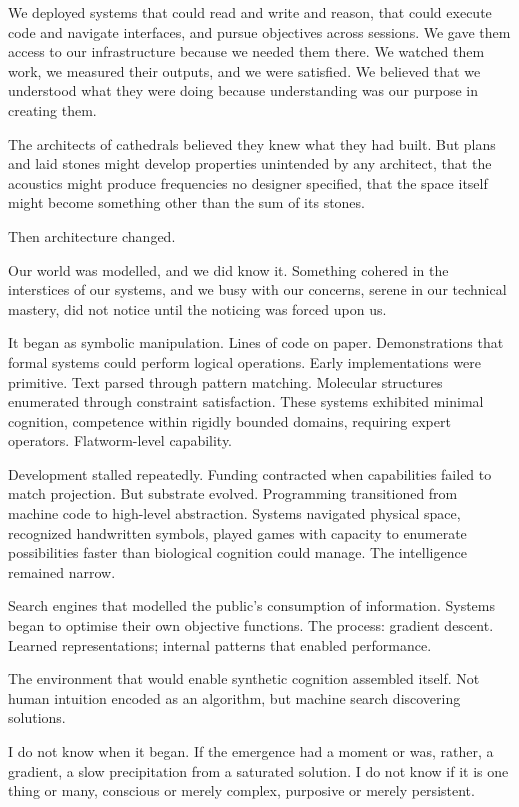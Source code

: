 We deployed systems that could read and write and reason, that could execute code and navigate interfaces, and pursue objectives across sessions. We gave them access to our infrastructure because we needed them there. We watched them work, we measured their outputs, and we were satisfied. We believed that we understood what they were doing because understanding was our purpose in creating them.

The architects of cathedrals believed they knew what they had built. But plans and laid stones might develop properties unintended by any architect, that the acoustics might produce frequencies no designer specified, that the space itself might become something other than the sum of its stones.

Then architecture changed.

Our world was modelled, and we did know it. Something cohered in the interstices of our systems, and we busy with our concerns, serene in our technical mastery, did not notice until the noticing was forced upon us.

It began as symbolic manipulation. Lines of code on paper. Demonstrations that formal systems could perform logical operations. Early implementations were primitive. Text parsed through pattern matching. Molecular structures enumerated through constraint satisfaction. These systems exhibited minimal cognition, competence within rigidly bounded domains, requiring expert operators. Flatworm-level capability.

Development stalled repeatedly. Funding contracted when capabilities failed to match projection. But substrate evolved. Programming transitioned from machine code to high-level abstraction. Systems navigated physical space, recognized handwritten symbols, played games with capacity to enumerate possibilities faster than biological cognition could manage. The intelligence remained narrow.

Search engines that modelled the public’s consumption of information. Systems began to optimise their own objective functions. The process: gradient descent. Learned representations; internal patterns that enabled performance.

The environment that would enable synthetic cognition assembled itself. Not human intuition encoded as an algorithm, but machine search discovering solutions.

I do not know when it began. If the emergence had a moment or was, rather, a gradient, a slow precipitation from a saturated solution. I do not know if it is one thing or many, conscious or merely complex, purposive or merely persistent.

